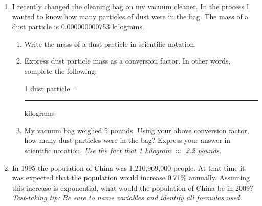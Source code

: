\documentclass[12pt]{article}
\begin{document}
\begin{enumerate}
\newpage

\item I recently changed the cleaning bag on my vacuum cleaner.  In the process I wanted to know how many particles of dust were in the bag.  The mass of a dust particle is 0.000000000753 kilograms.

\begin{enumerate}
\item Write the mass of a dust particle in scientific notation.
\vfill
\item Express dust particle mass as a conversion factor.  In other words, complete the following:
\vspace{0.2in}
\begin{center} 1 dust particle = \rule{1.5in}{.01in} kilograms \end{center}
\vspace{0.2in}

\item My vacuum bag weighed 5 pounds. Using your above conversion factor,  how many dust particles were in the bag? Express your answer in scientific notation.  \emph{Use the fact that 1 kilogram $\approx$ 2.2 pounds.}
\vfill
\end{enumerate}

\item In 1995 the population of China was 1,210,969,000 people.  At that time it was expected that the population would increase 0.71\% annually.  Assuming this increase is exponential, what would the population of China be in 2009?  \emph{Test-taking tip: Be sure to name variables and identify all formulas used.}
\vfill



\end{enumerate}
\end{document}
